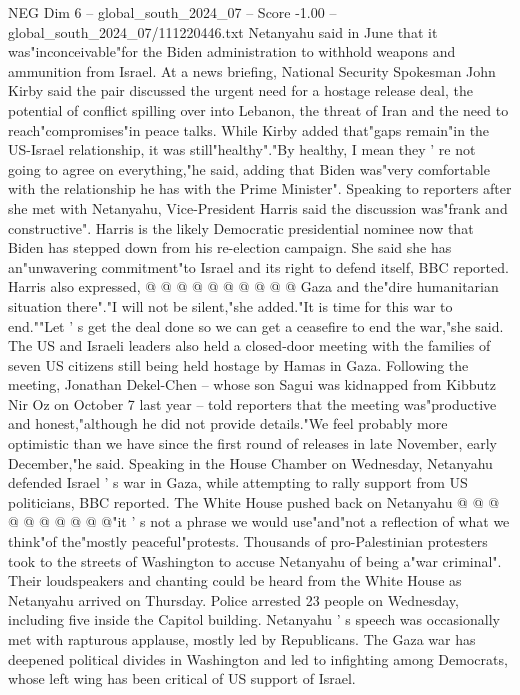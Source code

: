 \begin{textsample}{NEG Dim 6 – global\_south\_2024\_07 – Score -1.00 – global\_south\_2024\_07/111220446.txt}  \label{ex:f6_neg_125}
Netanyahu said in June that it was"inconceivable"for the Biden administration to withhold weapons and ammunition from Israel.
At a news briefing, National Security Spokesman John Kirby said the pair discussed the urgent need for a hostage release deal, the potential of conflict spilling over into Lebanon, the threat of Iran and the need to reach"compromises"in peace talks.
While Kirby added that"gaps remain"in the US-Israel relationship, it was still"healthy"."By healthy, I mean they ' re not going to agree on everything,"he said, adding that Biden was"very comfortable with the relationship he has with the Prime Minister".
Speaking to reporters after she met with Netanyahu, Vice-President Harris said the discussion was"frank and constructive".
Harris is the likely Democratic presidential nominee now that Biden has stepped down from his re-election campaign.
She said she has an"unwavering commitment"to Israel and its right to defend itself, BBC reported.
Harris also expressed, @ @ @ @ @ @ @ @ @ @ Gaza and the"dire humanitarian situation there"."I will not be silent,"she added."It is time for this war to end.""Let ' s get the deal done so we can get a ceasefire to end the war,"she said.
The US and Israeli leaders also held a closed-door meeting with the families of seven US citizens still being held hostage by Hamas in Gaza.
Following the meeting, Jonathan Dekel-Chen -- whose son Sagui was kidnapped from Kibbutz Nir Oz on October 7 last year -- told reporters that the meeting was"productive and honest,"although he did not provide details."We feel probably more optimistic than we have since the first round of releases in late November, early December,"he said.
Speaking in the House Chamber on Wednesday, Netanyahu defended Israel ' s war in Gaza, while attempting to rally support from US politicians, BBC reported.
The White House pushed back on Netanyahu @ @ @ @ @ @ @ @ @ @"it ' s not a phrase we would use"and"not a reflection of what we think"of the"mostly peaceful"protests.
Thousands of pro-Palestinian protesters took to the streets of Washington to accuse Netanyahu of being a"war criminal".
Their loudspeakers and chanting could be heard from the White House as Netanyahu arrived on Thursday.
Police arrested 23 people on Wednesday, including five inside the Capitol building.
Netanyahu ' s speech was occasionally met with rapturous applause, mostly led by Republicans.
The Gaza war has deepened political divides in Washington and led to infighting among Democrats, whose left wing has been critical of US support of Israel.

\end{textsample}
